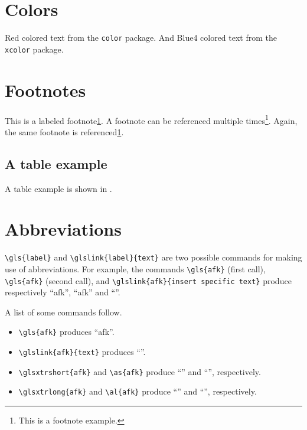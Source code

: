 \section{Colors}
\label{c2:s:colors}

{\color{red} Red colored text} from the \texttt{color} package.
{\color{Blue4} And Blue4 colored text} from the \texttt{xcolor} package.

\section{Footnotes}
\label{c2:s:footnotes}

This is a labeled footnote\cref{foot:example}.
A footnote can be referenced multiple times\footnote{\label{foot:example}This is a footnote example.}.
Again, the same footnote is referenced\cref{foot:example}.


\subsection{A table example}
\label{c2:ss:a-table-example}

A table example is shown in .




\section{Abbreviations}
\label{c2:s:abbreviations}

\verb+\gls{label}+ and \verb+\glslink{label}{text}+ are two possible commands for making use of abbreviations.
For example, the commands \verb+\gls{afk}+ (first call), \verb+\gls{afk}+ (second call), and \verb+\glslink{afk}{insert specific text}+ produce respectively ``\gls{afk}'', ``\gls{afk}'' and ``''.

A list of some commands follow.

\begin{itemize}
\item
\verb+\gls{afk}+ produces ``\gls{afk}''.
\item
\verb+\glslink{afk}{text}+ produces ``''.
\item
\verb+\glsxtrshort{afk}+ and \verb+\as{afk}+ produce ``'' and ``'', respectively.
\item
\verb+\glsxtrlong{afk}+ and \verb+\al{afk}+ produce ``'' and ``'', respectively.
\end{itemize}

